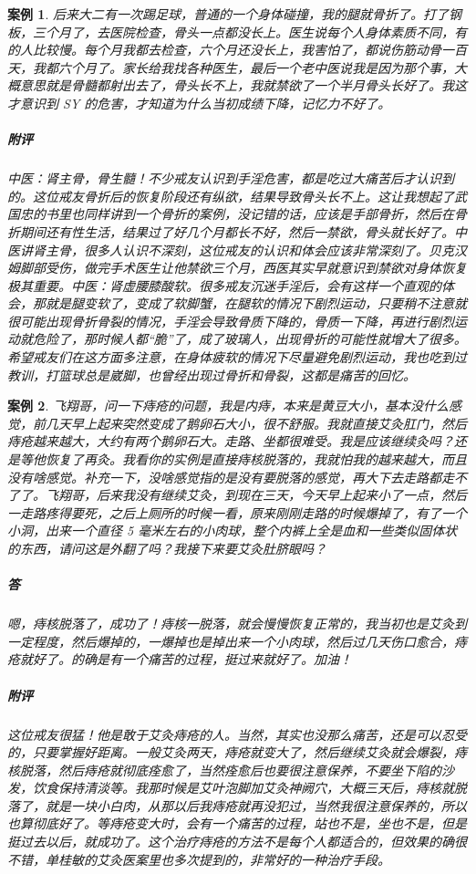 \documentclass{ctexart}
\newtheorem{case}{案例}
\begin{document}
\begin{case}
    后来大二有一次踢足球，普通的一个身体碰撞，我的腿就骨折了。打了钢板，三个月了，去医院检查，骨头一点都没长上。医生说每个人身体素质不同，有的人比较慢。每个月我都去检查，六个月还没长上，我害怕了，都说伤筋动骨一百天，我都六个月了。家长给我找各种医生，最后一个老中医说我是因为那个事，大概意思就是骨髓都射出去了，骨头长不上，我就禁欲了一个半月骨头长好了。我这才意识到 SY 的危害，才知道为什么当初成绩下降，记忆力不好了。
    \subparagraph{附评} 中医：肾主骨，骨生髓！不少戒友认识到手淫危害，都是吃过大痛苦后才认识到的。这位戒友骨折后的恢复阶段还有纵欲，结果导致骨头长不上。这让我想起了武国忠的书里也同样讲到一个骨折的案例，没记错的话，应该是手部骨折，然后在骨折期间还有性生活，结果过了好几个月都长不好，然后一禁欲，骨头就长好了。中医讲肾主骨，很多人认识不深刻，这位戒友的认识和体会应该非常深刻了。贝克汉姆脚部受伤，做完手术医生让他禁欲三个月，西医其实早就意识到禁欲对身体恢复极其重要。中医：肾虚腰膝酸软。很多戒友沉迷手淫后，会有这样一个直观的体会，那就是腿变软了，变成了软脚蟹，在腿软的情况下剧烈运动，只要稍不注意就很可能出现骨折骨裂的情况，手淫会导致骨质下降的，骨质一下降，再进行剧烈运动就危险了，那时候人都“脆”了，成了玻璃人，出现骨折的可能性就增大了很多。希望戒友们在这方面多注意，在身体疲软的情况下尽量避免剧烈运动，我也吃到过教训，打篮球总是崴脚，也曾经出现过骨折和骨裂，这都是痛苦的回忆。
\end{case}

\begin{case}
    飞翔哥，问一下痔疮的问题，我是内痔，本来是黄豆大小，基本没什么感觉，前几天早上起来突然变成了鹅卵石大小，很不舒服。我就直接艾灸肛门，然后痔疮越来越大，大约有两个鹅卵石大。走路、坐都很难受。我是应该继续灸吗？还是等他恢复了再灸。我看你的实例是直接痔核脱落的，我就怕我的越来越大，而且没有啥感觉。补充一下，没啥感觉指的是没有要脱落的感觉，再大下去走路都走不了了。飞翔哥，后来我没有继续艾灸，到现在三天，今天早上起来小了一点，然后一走路疼得要死，之后上厕所的时候一看，原来刚刚走路的时候爆掉了，有了一个小洞，出来一个直径 5 毫米左右的小肉球，整个内裤上全是血和一些类似固体状的东西，请问这是外翻了吗？我接下来要艾灸肚脐眼吗？
    \subparagraph{答} 嗯，痔核脱落了，成功了！痔核一脱落，就会慢慢恢复正常的，我当初也是艾灸到一定程度，然后爆掉的，一爆掉也是掉出来一个小肉球，然后过几天伤口愈合，痔疮就好了。的确是有一个痛苦的过程，挺过来就好了。加油！
    \subparagraph{附评} 这位戒友很猛！他是敢于艾灸痔疮的人。当然，其实也没那么痛苦，还是可以忍受的，只要掌握好距离。一般艾灸两天，痔疮就变大了，然后继续艾灸就会爆裂，痔核脱落，然后痔疮就彻底痊愈了，当然痊愈后也要很注意保养，不要坐下陷的沙发，饮食保持清淡等。我那时候是艾叶泡脚加艾灸神阙穴，大概三天后，痔核就脱落了，就是一块小白肉，从那以后我痔疮就再没犯过，当然我很注意保养的，所以也算彻底好了。等痔疮变大时，会有一个痛苦的过程，站也不是，坐也不是，但是挺过去以后，就成功了。这个治疗痔疮的方法不是每个人都适合的，但效果的确很不错，单桂敏的艾灸医案里也多次提到的，非常好的一种治疗手段。
\end{case}
\end{document}
